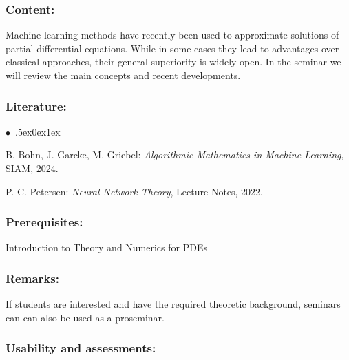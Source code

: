\documentclass[a4paper,10pt]{article}
\renewenvironment{itemize}{\begin{list}{$\bullet$\ }{\itemsep.5ex\setlength{\topsep}{0.5\itemsep}\parsep0ex\labelsep1ex\settowidth{\labelwidth}{$\bullet$\ }\setlength{\leftmargin}{\labelwidth}\addtolength{\leftmargin}{3ex}\addtolength{\leftmargin}{\labelsep}}}{\end{list}}
\begin{document}
\subsubsection*{\large
    Content:
}
Machine-learning methods have recently been used to approximate solutions of partial differential equations. While in some cases they lead to advantages over classical approaches, their general superiority is widely open. In the seminar we will review the main concepts and recent developments. 
\subsubsection*{\large
    Literature:
}
\begin{itemize}
\item
B. Bohn, J. Garcke, M. Griebel: \emph{Algorithmic Mathematics in Machine Learning}, SIAM, 2024.
\item
P. C. Petersen: \emph{Neural Network Theory}, Lecture Notes, 2022. 
\end{itemize}
\subsubsection*{\large
    Prerequisites:
}
Introduction to Theory and Numerics for PDEs
\subsubsection*{\large
    Remarks:
}
If students are interested and have the required theoretic background, seminars can can also be used as a proseminar. 
\cleardoublepage
\subsubsection*{\large
    Usability and assessments:
}
\end{document}
